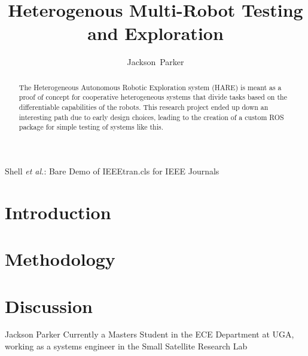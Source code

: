 \documentclass[journal]{IEEEtran}
\begin{document}
\onecolumn

\title{Heterogenous Multi-Robot Testing and Exploration}

\author{Jackson~Parker}

%
{Shell \MakeLowercase{\textit{et al.}}: Bare Demo of IEEEtran.cls for IEEE Journals}



\maketitle


\begin{abstract}
  The Heterogeneous Autonomous Robotic Exploration system (HARE) is meant as a proof
  of concept for cooperative heterogeneous systems that divide tasks based on the
  differentiable capabilities of the robots. This research project ended up down
  an interesting path due to early design choices, leading to the creation of a
  custom ROS package for simple testing of systems like this.
\end{abstract}


\section{Introduction}


\section{Methodology}


\section{Discussion}










\begin{IEEEbiography}{Jackson Parker}
Currently a Masters Student in the ECE Department at UGA, working as a systems engineer
in the Small Satellite Research Lab
\end{IEEEbiography}
\end{document}
